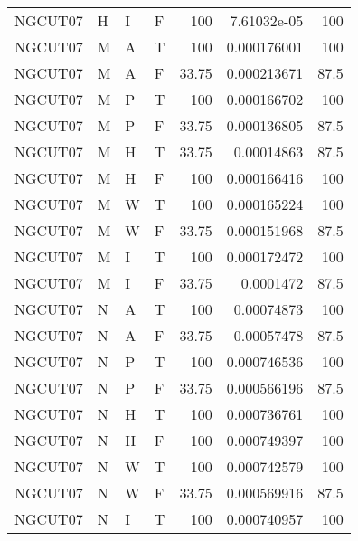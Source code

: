 \begin{longtable}{llllrrr}
    NGCUT07  & H         & I         & F          & 100        & 7.61032e-05 & 100      \\
    NGCUT07  & M         & A         & T          & 100        & 0.000176001 & 100      \\
    NGCUT07  & M         & A         & F          & 33.75      & 0.000213671 & 87.5     \\
    NGCUT07  & M         & P         & T          & 100        & 0.000166702 & 100      \\
    NGCUT07  & M         & P         & F          & 33.75      & 0.000136805 & 87.5     \\
    NGCUT07  & M         & H         & T          & 33.75      & 0.00014863  & 87.5     \\
    NGCUT07  & M         & H         & F          & 100        & 0.000166416 & 100      \\
    NGCUT07  & M         & W         & T          & 100        & 0.000165224 & 100      \\
    NGCUT07  & M         & W         & F          & 33.75      & 0.000151968 & 87.5     \\
    NGCUT07  & M         & I         & T          & 100        & 0.000172472 & 100      \\
    NGCUT07  & M         & I         & F          & 33.75      & 0.0001472   & 87.5     \\
    NGCUT07  & N         & A         & T          & 100        & 0.00074873  & 100      \\
    NGCUT07  & N         & A         & F          & 33.75      & 0.00057478  & 87.5     \\
    NGCUT07  & N         & P         & T          & 100        & 0.000746536 & 100      \\
    NGCUT07  & N         & P         & F          & 33.75      & 0.000566196 & 87.5     \\
    NGCUT07  & N         & H         & T          & 100        & 0.000736761 & 100      \\
    NGCUT07  & N         & H         & F          & 100        & 0.000749397 & 100      \\
    NGCUT07  & N         & W         & T          & 100        & 0.000742579 & 100      \\
    NGCUT07  & N         & W         & F          & 33.75      & 0.000569916 & 87.5     \\
    NGCUT07  & N         & I         & T          & 100        & 0.000740957 & 100      \\

\end{longtable}
